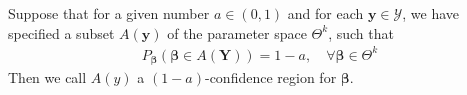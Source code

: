\begin{definition} 
\label{def:confidence_region}
Suppose that for a given number $a \in (0,1)$ and for each $\textbf{y} \in \mathcal{Y}$, we have specified a subset $A(\textbf{y})$ of the parameter space $\Theta^k$, such that
\begin{align*}
    P_{\boldsymbol{\beta}} (\boldsymbol{\beta} \in A(\textbf{Y})) = 1 - a, \quad \forall \boldsymbol{\beta} \in \Theta^k
\end{align*}
Then we call $A(y)$ a $(1-a)$-confidence region for $\boldsymbol{\beta}$.
\end{definition}

